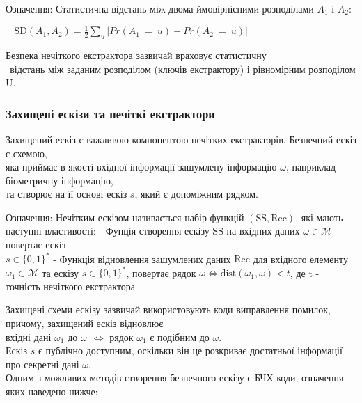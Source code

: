 \documentclass[11pt]{article}
\begin{document}
Означення: Статистична відстань між двома ймовірнісними розподілами
\(A_1\) і \(A_2\):

\(~~~~\text{SD}(A_1,A_2) = \frac{1}{2}\sum\limits_{u}|Pr(A_1~=~u)-Pr(A_2~=~u)|\)

Безпека нечіткого екстрактора зазвичай враховує статистичну\\
\(~~\)відстань між заданим розподілом (ключів екстрактору) і рівномірним
розподілом U.

    \hypertarget{ux437ux430ux445ux438ux449ux435ux43dux456-ux435ux441ux43aux456ux437ux438-ux442ux430-ux43dux435ux447ux456ux442ux43aux456-ux435ux43aux441ux442ux440ux430ux43aux442ux43eux440ux438}{%
\subsubsection{Захищені ескізи та нечіткі
екстрактори}\label{ux437ux430ux445ux438ux449ux435ux43dux456-ux435ux441ux43aux456ux437ux438-ux442ux430-ux43dux435ux447ux456ux442ux43aux456-ux435ux43aux441ux442ux440ux430ux43aux442ux43eux440ux438}}

Захищений ескіз є важливою компонентою нечітких екстракторів. Безпечний
ескіз є схемою,\\
яка приймає в якості вхідної інформації зашумлену інформацію \(\omega\),
наприклад біометричну інформацію,\\
та створює на її основі ескіз \(s\), який є допоміжним рядком.

Означення: Нечітким ескізом називається набір функцій
\((\text{SS},\text{Rec})\), які мають наступні властивості: - Фунція
створення ескізу \(\text{SS}\) на вхідних даних
\(\omega \in \mathcal{M}\) повертає ескіз\\
\(s \in \{0,1\}^*\) - Функція відновлення зашумлених даних
\(\text{Rec}\) для вхідного елементу \(\omega_1 \in \mathcal{M}\) та
ескізу \(s \in \{0,1\}^*\), повертає рядок
\(\omega \Longleftrightarrow \text{dist}(\omega_1,\omega)<t\), де t -
точність нечіткого екстрактора

Захищені схеми ескізу зазвичай використовують коди виправлення помилок,
причому, захищений ескіз відновлює\\
вхідні дані \(\omega_1\) до \(\omega ~~ \Longleftrightarrow\) рядок
\(\omega_1\) є подібним до \(\omega\).\\
Ескіз \(s\) є публічно доступним, оскільки він це розкриває достатньої
інформації про секретні дані \(\omega\).\\
Одним з можливих методів створення безпечного ескізу є БЧХ-коди,
означення яких наведено нижче:
\end{document}
